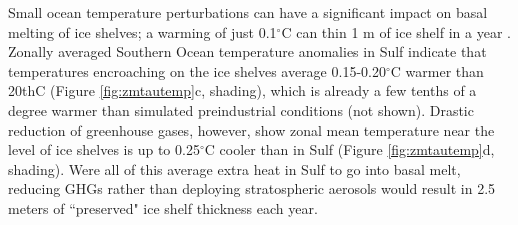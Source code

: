 \documentclass[draft,grl]{AGUTeX}  %
\begin{document}
\begin{article}


Small ocean temperature perturbations can have a significant impact on basal melting of ice shelves; a warming of just 0.1$^\circ$C can thin 1 m of ice shelf in a year \citep{rignot02}. Zonally averaged Southern Ocean temperature anomalies in Sulf indicate that temperatures encroaching on the ice shelves average 0.15-0.20$^\circ$C warmer than 20thC (Figure \ref{fig:zmtautemp}c, shading), which is already a few tenths of a degree warmer than simulated preindustrial conditions (not shown). Drastic reduction of greenhouse gases, however, show zonal mean temperature near the level of ice shelves is up to 0.25$^\circ$C cooler than in Sulf (Figure \ref{fig:zmtautemp}d, shading). Were all of this average extra heat in Sulf to go into basal melt, reducing GHGs rather than deploying stratospheric aerosols would result in 2.5 meters of ``preserved" ice shelf thickness each year. 


\end{article}
\end{document}

